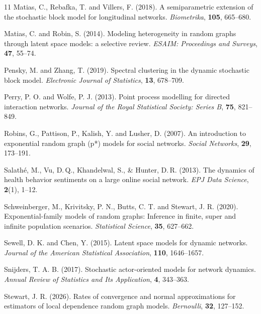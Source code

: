 \documentclass[12pt]{article}
\newcommand{\0}{{\bf 0}}
\begin{document}
\begin{thebibliography}{11}
Matias, C., Rebafka, T. and Villers, F. (2018). A semiparametric extension of the stochastic block model for longitudinal networks. \textit{Biometrika}, \textbf{105}, 665--680.


Matias, C. and Robin, S. (2014). Modeling heterogeneity in random graphs through latent space models: a selective review. \textit{ESAIM: Proceedings and Surveys}, \textbf{47}, 55--74.

Pensky, M. and Zhang, T. (2019). Spectral clustering in the dynamic stochastic block model. \textit{Electronic Journal of Statistics}, \textbf{13}, 678--709.

Perry, P. O. and Wolfe, P. J. (2013). Point process modelling for directed interaction networks. \textit{Journal of the Royal Statistical Society: Series B}, \textbf{75}, 821--849.

Robins, G., Pattison, P., Kalish, Y. and Lusher, D. (2007). An introduction to exponential random graph (p*) models for social networks. \textit{Social Networks}, \textbf{29}, 173--191.

Salathé, M., Vu, D.\,Q., Khandelwal, S., \& Hunter, D.\,R. (2013). The dynamics of health behavior sentiments on a large online social network. \textit{EPJ Data Science}, \textbf{2}(1), 1–12.

Schweinberger, M., Krivitsky, P. N., Butts, C. T. and Stewart, J. R. (2020). Exponential-family models of random graphs: Inference in finite, super and infinite population scenarios. \textit{Statistical Science}, \textbf{35}, 627--662.

Sewell, D. K. and Chen, Y. (2015). Latent space models for dynamic networks. \textit{Journal of the American Statistical Association}, \textbf{110}, 1646--1657.

Snijders, T. A. B. (2017). Stochastic actor-oriented models for network dynamics. \textit{Annual Review of Statistics and Its Application}, \textbf{4}, 343--363.

Stewart, J. R. (2026). Rates of convergence and normal approximations for estimators of local dependence random graph models. \textit{Bernoulli}, \textbf{32}, 127--152.


\end{thebibliography}
\end{document}
